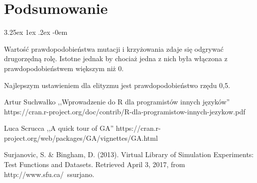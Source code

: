 \documentclass[11pt, a4paper]{article}
\makeatletter
\newcommand{\fbi}{\leavevmode{\parindent=1em\indent}}
\renewcommand\paragraph{\@startsection{paragraph}{5}{\z@}%
  {3.25ex \@plus1ex \@minus.2ex}%
  {-0em}%
  {\normalfont\normalsize\bfseries}}
\makeatother
\begin{document}
\newpage
\section{Podsumowanie}
\paragraph{}


\fbi
Wartość prawdopodobieństwa mutacji i krzyżowania zdaje się odgrywać drugorzędną rolę. Istotne jednak by chociaż jedna z nich była włączona z prawdopodobieństwem większym niż 0.

\fbi
Najlepszym ustawieniem dla elityzmu jest prawdopodobieństwo rzędu 0,5.

\newpage
\begin{thebibliography}{40}

Artur Suchwałko ,,Wprowadzenie do R dla programistów innych języków'' https://cran.r-project.org/doc/contrib/R-dla-programistow-innych-jezykow.pdf

Luca Scrucca ,,A quick tour of GA''
https://cran.r-project.org/web/packages/GA/vignettes/GA.html

Surjanovic, S. \& Bingham, D. (2013). Virtual Library of Simulation Experiments: Test Functions and Datasets. Retrieved April 3, 2017, from http://www.sfu.ca/~ssurjano.

\end{thebibliography}
\end{document}
